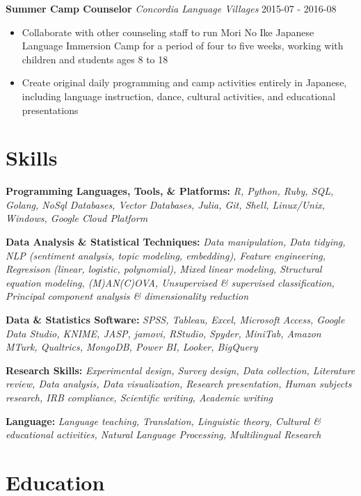 \documentclass[a4paper,9pt]{extarticle}
\begin{document}
\noindent
\textbf{Summer Camp Counselor}
\noindent
\textit{Concordia Language Villages} \hfill 2015-07 - 2016-08
\begin{itemize}

\item Collaborate with other counseling staff to run Mori No Ike Japanese Language Immersion Camp for a period of four to five weeks, working with children and students ages 8 to 18
\item Create original daily programming and camp activities entirely in Japanese, including language instruction, dance, cultural activities, and educational presentations
\end{itemize}



\section*{Skills}

\noindent
\textbf{Programming Languages, Tools, \& Platforms:}
\textit{R, Python, Ruby, SQL, Golang, NoSql Databases, Vector Databases, Julia, Git, Shell, Linux/Unix, Windows, Google Cloud Platform}

\noindent
\textbf{Data Analysis \& Statistical Techniques:}
\textit{Data manipulation, Data tidying, NLP (sentiment analysis, topic modeling, embedding), Feature engineering, Regresison (linear, logistic, polynomial), Mixed linear modeling, Structural equation modeling, (M)AN(C)OVA, Unsupervised \& supervised classification, Principal component analysis \& dimensionality reduction}

\noindent
\textbf{Data \& Statistics Software:}
\textit{SPSS, Tableau, Excel, Microsoft Access, Google Data Studio, KNIME, JASP, jamovi, RStudio, Spyder, MiniTab, Amazon MTurk, Qualtrics, MongoDB, Power BI, Looker, BigQuery}

\noindent
\textbf{Research Skills:}
\textit{Experimental design, Survey design, Data collection, Literature review, Data analysis, Data visualization, Research presentation, Human subjects research, IRB compliance, Scientific writing, Academic writing}

\noindent
\textbf{Language:}
\textit{Language teaching, Translation, Linguistic theory, Cultural \& educational activities, Natural Language Processing, Multilingual Research}



\section*{Education}
\end{document}
